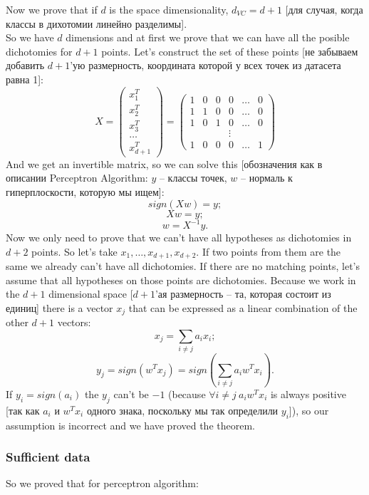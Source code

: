 Now we prove that if $d$ is the space dimensionality, $d_{VC}=d+1$ [для случая, когда классы в дихотомии линейно разделимы].\\
So we have $d$ dimensions and at first we prove that we can have all the posible dichotomies for $d+1$ points. Let's construct the set of these points [не забываем добавить $d+1$'ую размерность, координата которой у всех точек из датасета равна 1]:
$$X=
\begin{pmatrix}
  x_1^T \\
  x_2^T \\
  x_3^T \\
  \ldots \\
  x_{d+1}^T
\end{pmatrix}
=
\begin{pmatrix}
  1 & 0 & 0 & 0 & \ldots & 0 \\
  1 & 1 & 0 & 0 & \ldots & 0 \\
  1 & 0 & 1 & 0 & \ldots & 0 \\
    &   &   & \vdots \\
  1 & 0 & 0 & 0 & \ldots & 1
\end{pmatrix}
$$
And we get an invertible matrix, so we can solve this [обозначения как в описании Perceptron Algorithm: $y$ -- классы точек, $w$ -- нормаль к гиперплоскости, которую мы ищем]:
$$sign(Xw)=y;$$
$$Xw=y;$$
$$w=X^{-1}y.$$
Now we only need to prove that we can't have all hypotheses as dichotomies in $d+2$ points. So let's take $x_1,\ldots,x_{d+1},x_{d+2}$. If two points from them are the same we already can't have all dichotomies. If there are no matching points, let's assume that all hypotheses on those points are dichotomies. Because we work in the $d+1$ dimensional space [$d+1$'ая размерность -- та, которая состоит из единиц] there is a vector $x_j$ that can be expressed as a linear combination of the other $d+1$ vectors:
$$x_j=\sum\limits_{i\ne j}a_ix_i;$$
$$y_j=sign(w^Tx_j)=sign\left(\sum\limits_{i\ne j}a_iw^Tx_i\right).$$
If $y_i=sign(a_i)$ the $y_j$ can't be $-1$ (because $\forall i\ne j\ a_iw^Tx_i$ is always positive [так как $a_i$ и $w^Tx_i$ одного знака, поскольку мы так определили $y_i$]), so our assumption is incorrect and we have proved the theorem.

\subsubsection*{Sufficient data}

So we proved that for perceptron algorithm:

